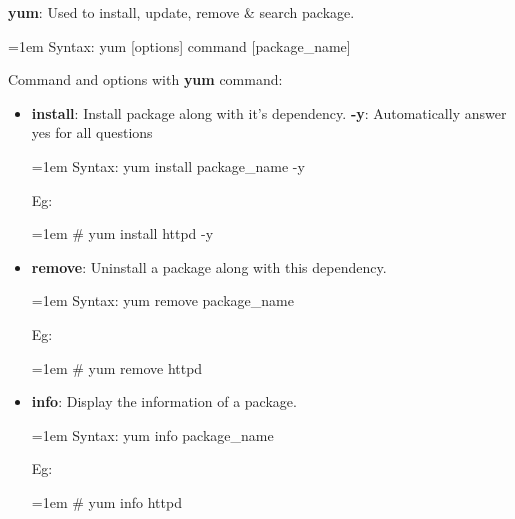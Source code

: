 \setlength{\columnsep}{3pt}
\begin{flushleft}
	\bigskip
	
	\textbf{yum}: Used to install, update, remove \& search package.
	\begin{tcolorbox}[breakable,notitle,boxrule=-0pt,colback=pink,colframe=pink]
		\color{black}
		\font=1em
		Syntax: yum [options] command [package\_name]
		\font=4pt
	\end{tcolorbox}
	Command and options with \textbf{yum} command:
	
	\begin{itemize}
		\item \textbf{install}: Install package along with it's dependency.
		\newline
		\textbf{-y}: Automatically answer yes for all questions
		\begin{tcolorbox}[breakable,notitle,boxrule=-0pt,colback=pink,colframe=pink]
			\color{black}
			\font=1em
			Syntax: yum install package\_name -y
			\font=4pt
		\end{tcolorbox}
		Eg:
		\begin{tcolorbox}[breakable,notitle,boxrule=-0pt,colback=black,colframe=black]
			\color{green}
			\font=1em
			\# yum install httpd -y
			\font=4pt
		\end{tcolorbox}
		\bigskip
		\bigskip
		\item \textbf{remove}: Uninstall a package along with this dependency.
		\begin{tcolorbox}[breakable,notitle,boxrule=-0pt,colback=pink,colframe=pink]
			\color{black}
			\font=1em
			Syntax: yum remove package\_name 
			\font=4pt
		\end{tcolorbox}
		Eg:
		\begin{tcolorbox}[breakable,notitle,boxrule=-0pt,colback=black,colframe=black]
			\color{green}
			\font=1em
			\# yum remove httpd
			\font=4pt
		\end{tcolorbox}
		\bigskip
		\bigskip		
		
		\item \textbf{info}: Display the information of a package.
		\begin{tcolorbox}[breakable,notitle,boxrule=-0pt,colback=pink,colframe=pink]
			\color{black}
			\font=1em
			Syntax: yum info package\_name 
			\font=4pt
		\end{tcolorbox}
		Eg:
		\begin{tcolorbox}[breakable,notitle,boxrule=-0pt,colback=black,colframe=black]
			\color{green}
			\font=1em
			\# yum info httpd
			\font=4pt
		\end{tcolorbox}
		\bigskip
		\bigskip		


\end{itemize}
\end{flushleft}
